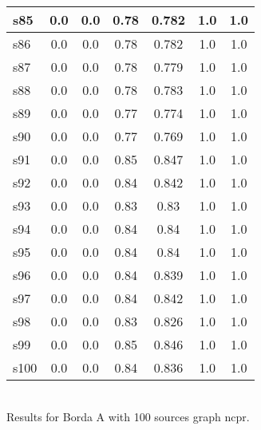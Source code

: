 \documentclass{article}
\begin{document}
\begin{tabular}{|l|c|c|c|c|c|c|}
\hline
s85 &0.0 & 0.0 & 0.78 & 0.782 & 1.0 & 1.0\\
\hline
s86 &0.0 & 0.0 & 0.78 & 0.782 & 1.0 & 1.0\\
\hline
s87 &0.0 & 0.0 & 0.78 & 0.779 & 1.0 & 1.0\\
\hline
s88 &0.0 & 0.0 & 0.78 & 0.783 & 1.0 & 1.0\\
\hline
s89 &0.0 & 0.0 & 0.77 & 0.774 & 1.0 & 1.0\\
\hline
s90 &0.0 & 0.0 & 0.77 & 0.769 & 1.0 & 1.0\\
\hline
s91 &0.0 & 0.0 & 0.85 & 0.847 & 1.0 & 1.0\\
\hline
s92 &0.0 & 0.0 & 0.84 & 0.842 & 1.0 & 1.0\\
\hline
s93 &0.0 & 0.0 & 0.83 & 0.83 & 1.0 & 1.0\\
\hline
s94 &0.0 & 0.0 & 0.84 & 0.84 & 1.0 & 1.0\\
\hline
s95 &0.0 & 0.0 & 0.84 & 0.84 & 1.0 & 1.0\\
\hline
s96 &0.0 & 0.0 & 0.84 & 0.839 & 1.0 & 1.0\\
\hline
s97 &0.0 & 0.0 & 0.84 & 0.842 & 1.0 & 1.0\\
\hline
s98 &0.0 & 0.0 & 0.83 & 0.826 & 1.0 & 1.0\\
\hline
s99 &0.0 & 0.0 & 0.85 & 0.846 & 1.0 & 1.0\\
\hline
s100 &0.0 & 0.0 & 0.84 & 0.836 & 1.0 & 1.0\\
\hline
\end{tabular}\\

\noindent Results for Borda A with 100 sources graph ncpr.
\end{document}
